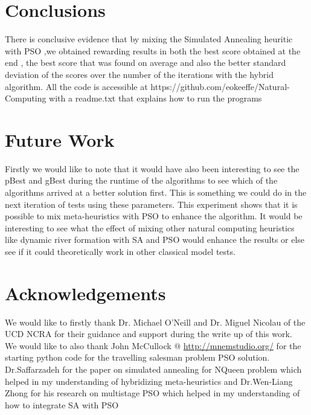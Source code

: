 \documentclass{article}[]
\begin{document}
\section{Conclusions}
There is conclusive evidence that by mixing the Simulated Annealing heuritic with PSO ,we obtained rewarding results in both the best score obtained at the end , the best score that was found on average and also the better standard deviation of the scores over the number of the iterations with the hybrid algorithm.
All the code is accessible at https://github.com/eokeeffe/Natural-Computing with a readme.txt that explains how to run the programs

\section{Future Work}
Firstly we would like to note that it would have also been interesting to see the pBest and gBest during the runtime of the algorithms to see which of the algorithms arrived at a better solution first. This is something we could do in the next iteration of tests using these parameters.
This experiment shows that it is possible to mix meta-heuristics with PSO to enhance the algorithm. It would be interesting to see what the effect of mixing other natural computing heuristics like dynamic river formation with SA and PSO would enhance the results or else see if it could theoretically work in other classical model tests.  

\section{Acknowledgements}
We would like to firstly thank Dr. Michael O'Neill and Dr. Miguel Nicolau of the UCD NCRA for their guidance and support during the write up of this work.\\
We would like to also thank John McCullock @
\url{http://mnemstudio.org/} for the starting python code for the travelling salesman problem PSO solution.\\
Dr.Saffarzadeh for the paper on simulated annealing for NQueen problem which helped in my understanding of hybridizing meta-heuristics \cite{Saffarzadeh2010}
and Dr.Wen-Liang Zhong for his research on multistage PSO which helped in my understanding of how to integrate SA with PSO\cite{Zhong2007}



\end{document}
